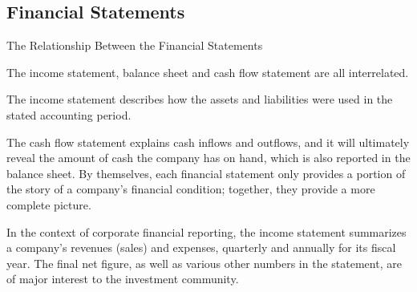 \documentclass[]{book}
\theoremstyle{definition}
\theoremstyle{definition}
\theoremstyle{definition}
\theoremstyle{remark}
\begin{document}
\subsection{Financial Statements}\label{financial-statements}

The Relationship Between the Financial Statements

The income statement, balance sheet and cash flow statement are all
interrelated.

The income statement describes how the assets and liabilities were used
in the stated accounting period.

The cash flow statement explains cash inflows and outflows, and it will
ultimately reveal the amount of cash the company has on hand, which is
also reported in the balance sheet. By themselves, each financial
statement only provides a portion of the story of a company's financial
condition; together, they provide a more complete picture.

In the context of corporate financial reporting, the income statement
summarizes a company's revenues (sales) and expenses, quarterly and
annually for its fiscal year. The final net figure, as well as various
other numbers in the statement, are of major interest to the investment
community.
\end{document}
